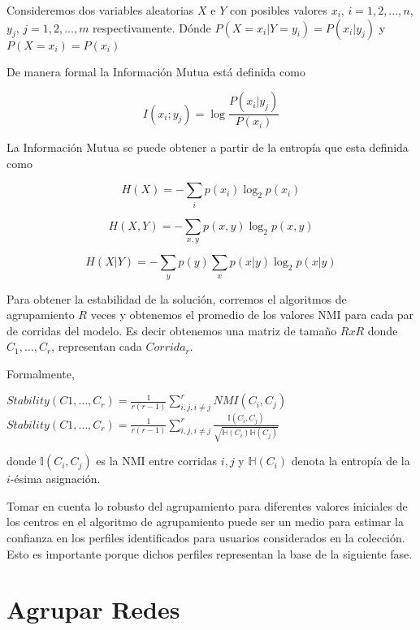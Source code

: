 Consideremos dos variables aleatorias $X$ e $Y$ con posibles valores $x_i$, $i=1,2,...,n$, $y_j$, $j=1,2,...,m$ respectivamente. Dónde $ 
{\displaystyle P(X=x_{i}|Y=y_{i})=P(x_{i}|y_{j})}$ y ${\displaystyle P(X=x_{i})=P(x_{i})}$

De manera formal la Información Mutua está definida como

$$ {\displaystyle I(x_{i};y_{j})=\log {\frac {P(x_{i}|y_{j})}{P(x_{i})}}} $$


La Información Mutua se puede obtener a partir de la entropía que esta definida como

$${\displaystyle H(X)=-\sum _{i}p(x_{i})\log _{2}p(x_{i})}$$

$${\displaystyle H(X,Y)=-\sum _{x,y}p(x,y)\log _{2}p(x,y)}$$

$${\displaystyle H(X|Y)=-\sum _{y}p(y)\sum _{x}p(x|y)\log _{2}p(x|y)}$$

Para obtener la estabilidad de la solución, corremos el algoritmos de agrupamiento $R$ veces y obtenemos el promedio de los valores NMI para cada par de corridas del modelo. Es decir obtenemos una matriz de tamaño $R x R$ donde $C_1,\ldots,C_r$, representan cada $Corrida_r$.

Formalmente, 

\begin{center}\label{eq:PNMI}
$Stability(C1,\ldots,C_r) = \frac{1}{r(r-1)}\sum_{i,j,i\not=j}^{r}NMI(C_i,C_j)$ \\
$Stability(C1,\ldots,C_r) = \frac{1}{r(r-1)}\sum_{i,j,i\not=j}^{r} \frac{\mathbb{I}(C_i,C_j)}{\sqrt{\mathbb{H}(C_i)\mathbb{H}(C_j)}}$
\end{center}

donde $\mathbb{I}(C_i,C_j)$ es la NMI entre corridas $i,j$ y $\mathbb{H}(C_i)$ denota la entropía de la $i$-ésima asignación.

Tomar en cuenta lo robusto del agrupamiento para diferentes valores iniciales de los centros en el algoritmo de agrupamiento puede ser un medio para estimar la confianza en los perfiles identificados para usuarios considerados en la colección. Esto es importante porque dichos perfiles representan la base de la siguiente fase. 

\section{Agrupar Redes}
\label{sec:system:sec3}

